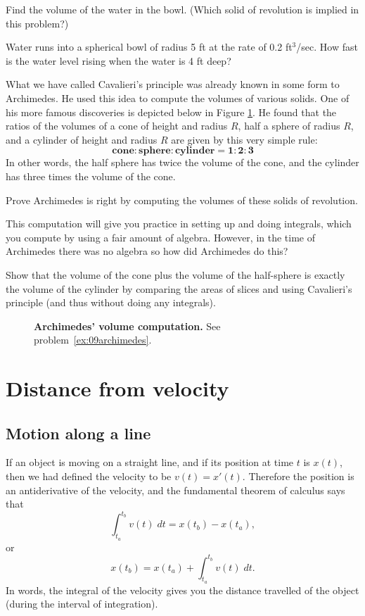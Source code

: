 \begin{multicols}{2}
\subprob  Find the volume of the water in the bowl.  (Which
solid of revolution is implied in this problem?)

\subprob  Water runs into a spherical bowl of radius 5 ft at
the rate of 0.2 ft${}^3$/sec. How fast is the water level rising
when the water is 4 ft deep?

\problem \label{ex:09archimedes}
What we have called Cavalieri's principle was already known in some
form to Archimedes.  He used this idea to compute the volumes of
various solids.  One of his more famous discoveries is depicted below
in Figure \ref{fig:09archimedes-sphere-cone-cylinder}.  He found that
the ratios of the volumes of a cone of height and radius $R$,
half a sphere of radius $R$, and a cylinder of height and
radius $R$ are given by this very simple rule:
\[
  \textbf{cone}:
  \textbf{sphere}:
  \textbf{cylinder}
  =
  \textbf{1}:\textbf{2}:\textbf{3}
\]
In other words, the half sphere has twice the volume of the cone, and the
cylinder has three times the volume of the cone.

\subprob Prove Archimedes is right by computing the volumes of these solids
of revolution.  

\smallskip

This computation will give you practice in setting up and doing integrals, which
you compute by using a fair amount of algebra. 
However, in the time of Archimedes there was no algebra so how did Archimedes do
this?  

\carefulnow\subprob Show that the volume of the cone plus the volume of the half-sphere is
exactly the volume of the cylinder by comparing the areas of slices and using
Cavalieri's principle (and thus without doing any integrals).

\end{multicols}
\noproblemfont
\begin{figure}[h]
  \centering 
  \caption{\textbf{Archimedes' volume computation. }  See
    problem~\ref{ex:09archimedes}.}
  \label{fig:09archimedes-sphere-cone-cylinder}
\end{figure}

\section{Distance from velocity}

\subsection{Motion along a line}
If an object is moving on a straight line, and if its position at time $t$ is
$x(t)$, then we had defined the velocity to be $v(t) = x'(t)$.  Therefore the
position is an antiderivative of the velocity, and the fundamental theorem of
calculus says that
\begin{equation}
  \label{eq:distance-from-velocity}
  \int_{t_a}^{t_b} v(t)\;dt = x(t_b) - x(t_a),
\end{equation}
or
\[
x(t_b) = x(t_a) + \int_{t_a}^{t_b} v(t)\; dt.
\]
In words, the integral of the velocity gives you the distance travelled of the
object (during the interval of integration).

